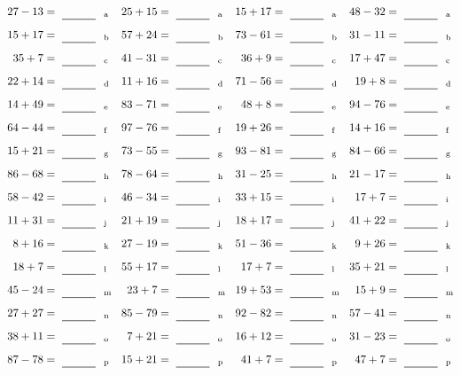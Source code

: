 \documentclass
[
  draft    = true,
  fontsize = 11pt,
  parskip  = half-
]
{scrartcl}
\begin{document}
\clearpage
\begin{align*}
    \pline{27-13}&=\rline{a}
  & \pline{25+15}&=\rline{a}
  & \pline{15+17}&=\rline{a}
  & \pline{48-32}&=\rline{a} \\[1ex]
    \pline{15+17}&=\rline{b}
  & \pline{57+24}&=\rline{b}
  & \pline{73-61}&=\rline{b}
  & \pline{31-11}&=\rline{b} \\[1ex]
    \pline{35+7}&=\rline{c}
  & \pline{41-31}&=\rline{c}
  & \pline{36+9}&=\rline{c}
  & \pline{17+47}&=\rline{c} \\[1ex]
    \pline{22+14}&=\rline{d}
  & \pline{11+16}&=\rline{d}
  & \pline{71-56}&=\rline{d}
  & \pline{19+8}&=\rline{d} \\[1ex]
    \pline{14+49}&=\rline{e}
  & \pline{83-71}&=\rline{e}
  & \pline{48+8}&=\rline{e}
  & \pline{94-76}&=\rline{e} \\[1ex]
    \pline{64-44}&=\rline{f}
  & \pline{97-76}&=\rline{f}
  & \pline{19+26}&=\rline{f}
  & \pline{14+16}&=\rline{f} \\[1ex]
    \pline{15+21}&=\rline{g}
  & \pline{73-55}&=\rline{g}
  & \pline{93-81}&=\rline{g}
  & \pline{84-66}&=\rline{g} \\[1ex]
    \pline{86-68}&=\rline{h}
  & \pline{78-64}&=\rline{h}
  & \pline{31-25}&=\rline{h}
  & \pline{21-17}&=\rline{h} \\[1ex]
    \pline{58-42}&=\rline{i}
  & \pline{46-34}&=\rline{i}
  & \pline{33+15}&=\rline{i}
  & \pline{17+7}&=\rline{i} \\[1ex]
    \pline{11+31}&=\rline{j}
  & \pline{21+19}&=\rline{j}
  & \pline{18+17}&=\rline{j}
  & \pline{41+22}&=\rline{j} \\[1ex]
    \pline{8+16}&=\rline{k}
  & \pline{27-19}&=\rline{k}
  & \pline{51-36}&=\rline{k}
  & \pline{9+26}&=\rline{k} \\[1ex]
    \pline{18+7}&=\rline{l}
  & \pline{55+17}&=\rline{l}
  & \pline{17+7}&=\rline{l}
  & \pline{35+21}&=\rline{l} \\[1ex]
    \pline{45-24}&=\rline{m}
  & \pline{23+7}&=\rline{m}
  & \pline{19+53}&=\rline{m}
  & \pline{15+9}&=\rline{m} \\[1ex]
    \pline{27+27}&=\rline{n}
  & \pline{85-79}&=\rline{n}
  & \pline{92-82}&=\rline{n}
  & \pline{57-41}&=\rline{n} \\[1ex]
    \pline{38+11}&=\rline{o}
  & \pline{7+21}&=\rline{o}
  & \pline{16+12}&=\rline{o}
  & \pline{31-23}&=\rline{o} \\[1ex]
    \pline{87-78}&=\rline{p}
  & \pline{15+21}&=\rline{p}
  & \pline{41+7}&=\rline{p}
  & \pline{47+7}&=\rline{p}
\end{align*}
\end{document}
